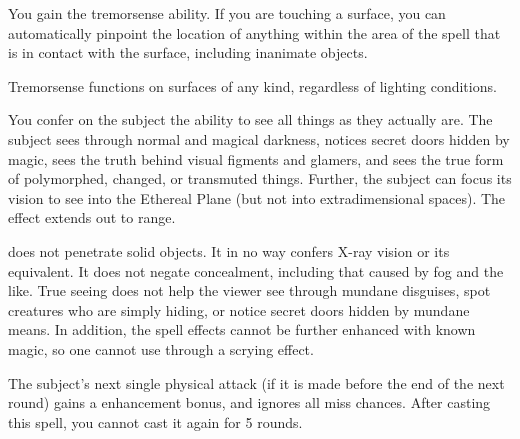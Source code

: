 \begin{spelleffect}
  You gain the tremorsense ability. If you are touching a surface, you can automatically pinpoint the location of anything within the area of the spell that is in contact with the surface, including inanimate objects.
\end{spelleffect}
\begin{spellnotes}
  Tremorsense functions on surfaces of any kind, regardless of lighting conditions.
\end{spellnotes}

\spelldur{\durshort}
\begin{spelleffect}
  You confer on the subject the ability to see all things as they actually are. The subject sees through normal and magical darkness, notices secret doors hidden by magic, sees the truth behind visual figments and glamers, and sees the true form of polymorphed, changed, or transmuted things. Further, the subject can focus its vision to see into the Ethereal Plane (but not into extradimensional spaces). The effect extends out to \rngmed range.
\end{spelleffect}
\begin{spellnotes}
   does not penetrate solid objects. It in no way confers X-ray vision or its equivalent. It does not negate concealment, including that caused by fog and the like. True seeing does not help the viewer see through mundane disguises, spot creatures who are simply hiding, or notice secret doors hidden by mundane means. In addition, the spell effects cannot be further enhanced with known magic, so one cannot use  through a scrying effect.
\end{spellnotes}

\spellrng{\rngmed}
\begin{spelleffect}
   The subject's next single physical attack (if it is made before the end of the next round) gains a  enhancement bonus, and ignores all miss chances. After casting this spell, you cannot cast it again for 5 rounds.
\end{spelleffect}


